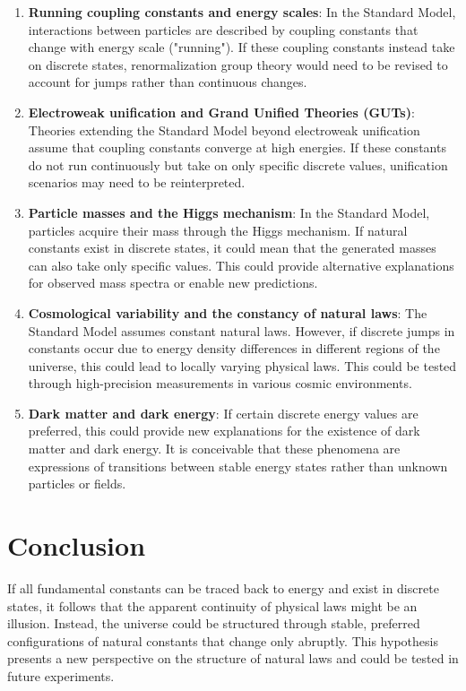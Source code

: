 \documentclass{article}
\begin{document}
	\begin{enumerate}
		\item \textbf{Running coupling constants and energy scales}: In the Standard Model, interactions between particles are described by coupling constants that change with energy scale ("running"). If these coupling constants instead take on discrete states, renormalization group theory would need to be revised to account for jumps rather than continuous changes.
		\item \textbf{Electroweak unification and Grand Unified Theories (GUTs)}: Theories extending the Standard Model beyond electroweak unification assume that coupling constants converge at high energies. If these constants do not run continuously but take on only specific discrete values, unification scenarios may need to be reinterpreted.
		\item \textbf{Particle masses and the Higgs mechanism}: In the Standard Model, particles acquire their mass through the Higgs mechanism. If natural constants exist in discrete states, it could mean that the generated masses can also take only specific values. This could provide alternative explanations for observed mass spectra or enable new predictions.
		\item \textbf{Cosmological variability and the constancy of natural laws}: The Standard Model assumes constant natural laws. However, if discrete jumps in constants occur due to energy density differences in different regions of the universe, this could lead to locally varying physical laws. This could be tested through high-precision measurements in various cosmic environments.
		\item \textbf{Dark matter and dark energy}: If certain discrete energy values are preferred, this could provide new explanations for the existence of dark matter and dark energy. It is conceivable that these phenomena are expressions of transitions between stable energy states rather than unknown particles or fields.
	\end{enumerate}
	
	\section{Conclusion}
	
	If all fundamental constants can be traced back to energy and exist in discrete states, it follows that the apparent continuity of physical laws might be an illusion. Instead, the universe could be structured through stable, preferred configurations of natural constants that change only abruptly. This hypothesis presents a new perspective on the structure of natural laws and could be tested in future experiments.
	\appendix
\end{document}
